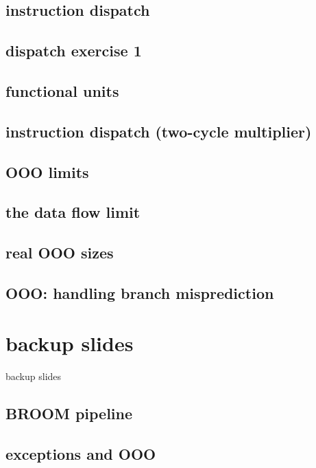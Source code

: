 \subsection{instruction dispatch}


\subsection{dispatch exercise 1}


\subsection{functional units}


\subsection{instruction dispatch (two-cycle multiplier)}



\subsection{OOO limits}


\subsection{the data flow limit}


\subsection{real OOO sizes}



\subsection{OOO: handling branch misprediction}


\section{backup slides}
\begin{frame}{backup slides}
\end{frame}

\subsection{BROOM pipeline}



\subsection{exceptions and OOO}


